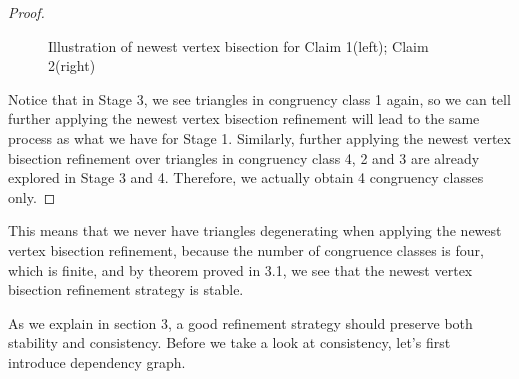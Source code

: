 \begin{proof}
\begin{figure}[h!]
    \caption{Illustration of newest vertex bisection for Claim 1(left); Claim 2(right)}
    \end{figure}



    Notice that in Stage 3, we see triangles in congruency class 1 again, so we can tell further applying the newest vertex bisection refinement will lead to the same process as what we have for Stage 1. Similarly, further applying the newest vertex bisection refinement over triangles in congruency class 4, 2 and 3 are already explored in Stage 3 and 4. Therefore, we actually obtain 4 congruency classes only.
    \end{proof}
    This means that we never have triangles degenerating when applying the newest vertex bisection refinement, because the number of congruence classes is four, which is finite, and by theorem proved in 3.1, we see that the newest vertex bisection refinement strategy is stable.

    As we explain in section 3, a good refinement strategy should preserve both stability and consistency. Before we take a look at consistency, let's first introduce dependency graph.

